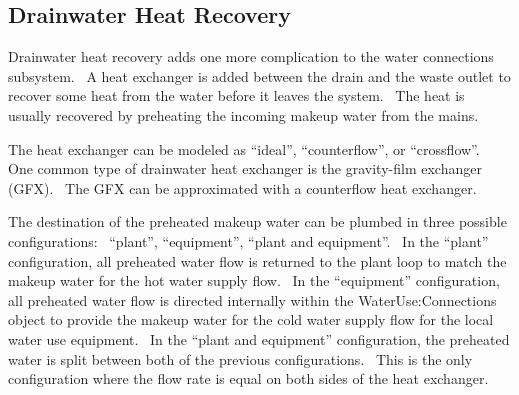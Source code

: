 \subsection{Drainwater Heat Recovery}\label{drainwater-heat-recovery}

Drainwater heat recovery adds one more complication to the water connections subsystem.~ A heat exchanger is added between the drain and the waste outlet to recover some heat from the water before it leaves the system.~ The heat is usually recovered by preheating the incoming makeup water from the mains.

The heat exchanger can be modeled as ``ideal'', ``counterflow'', or ``crossflow''.~ One common type of drainwater heat exchanger is the gravity-film exchanger (GFX).~ The GFX can be approximated with a counterflow heat exchanger.

The destination of the preheated makeup water can be plumbed in three possible configurations:~ ``plant'', ``equipment'', ``plant and equipment''.~ In the ``plant'' configuration, all preheated water flow is returned to the plant loop to match the makeup water for the hot water supply flow.~ In the ``equipment'' configuration, all preheated water flow is directed internally within the WaterUse:Connections object to provide the makeup water for the cold water supply flow for the local water use equipment.~ In the ``plant and equipment'' configuration, the preheated water is split between both of the previous configurations.~ This is the only configuration where the flow rate is equal on both sides of the heat exchanger.

